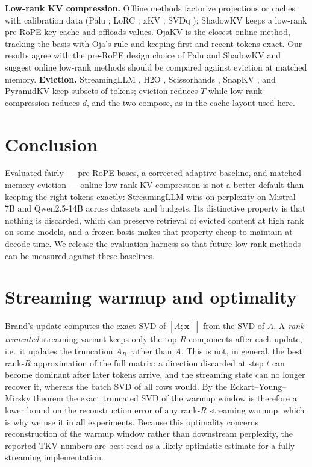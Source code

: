 \documentclass{article}
\begin{document}
\textbf{Low-rank KV compression.} Offline methods factorize projections or
caches with calibration data (Palu \citealp{palu2024}; LoRC
\citealp{lorc2024}; xKV \citealp{xkv2025}; SVDq \citealp{svdq2025}); ShadowKV
\citep{shadowkv2024} keeps a low-rank pre-RoPE key cache and offloads values.
OjaKV \citep{ojakov2025} is the closest online method, tracking the basis with
Oja's rule and keeping first and recent tokens exact. Our results agree with
the pre-RoPE design choice of Palu and ShadowKV and suggest online low-rank
methods should be compared against eviction at matched memory.
\textbf{Eviction.} StreamingLLM \citep{streamingllm2023}, H2O \citep{h2o2023},
Scissorhands \citep{scissorhands2023}, SnapKV \citep{snapkv2024}, and PyramidKV
\citep{pyramidkv2024} keep subsets of tokens; eviction reduces $T$ while
low-rank compression reduces $d$, and the two compose, as in the cache layout
used here.

\section{Conclusion}

Evaluated fairly --- pre-RoPE bases, a corrected adaptive baseline, and
matched-memory eviction --- online low-rank KV compression is not a better
default than keeping the right tokens exactly: StreamingLLM wins on
perplexity on Mistral-7B and Qwen2.5-14B across datasets and budgets. Its
distinctive property is that nothing is discarded, which can preserve
retrieval of evicted content at high rank on some models, and a frozen basis
makes that property cheap to maintain at decode time. We release the
evaluation harness so that future low-rank methods can be measured against
these baselines.

\small



\appendix
\section{Streaming warmup and optimality}
\label{app:brand}

Brand's update \citep{brand2006} computes the exact SVD of $[A;\mathbf{x}^\top]$
from the SVD of $A$. A \emph{rank-truncated} streaming variant keeps only the
top $R$ components after each update, i.e.\ it updates the truncation
$A_R$ rather than $A$. This is not, in general, the best rank-$R$
approximation of the full matrix: a direction discarded at step $t$ can become
dominant after later tokens arrive, and the streaming state can no longer
recover it, whereas the batch SVD of all rows would. By the
Eckart--Young--Mirsky theorem \citep{eckart1936,mirsky1960} the exact truncated
SVD of the warmup window is therefore a lower bound on the reconstruction
error of any rank-$R$ streaming warmup, which is why we use it in all
experiments. Because this optimality concerns reconstruction of the warmup
window rather than downstream perplexity, the reported TKV numbers are best
read as a likely-optimistic estimate for a fully streaming implementation.
\end{document}
